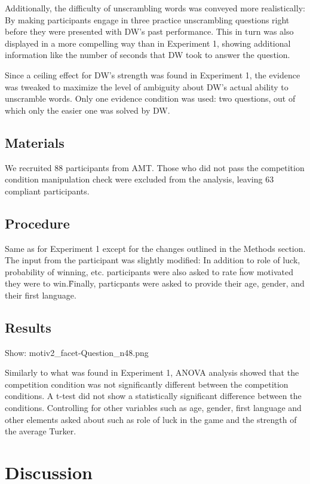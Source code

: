\documentclass{article}
\begin{document}
Additionally, the difficulty of unscrambling words was conveyed more realistically: By making participants engage in three practice unscrambling questions right before they were presented with DW's past performance. This in turn was also displayed in a more compelling way than in Experiment 1, showing additional information like the number of seconds that DW took to answer the question.

Since a ceiling effect for DW's strength was found in Experiment 1, the evidence was tweaked to maximize the level of ambiguity about DW's actual ability to unscramble words. Only one evidence condition was used: two questions, out of which only the easier one was solved by DW.

\subsection{Materials}

We recruited 88 participants from AMT. Those who did not pass the competition condition manipulation check were excluded from the analysis, leaving 63 compliant participants.

\subsection{Procedure}

Same as for Experiment 1 except for the changes outlined in the Methods section. The input from the participant was slightly modified: In addition to role of luck, probability of winning, etc. participants were also asked to rate \"how motivated they were to win.\" Finally, particpants were asked to provide their age, gender, and their first language. 

\subsection{Results}

Show: motiv2_facet-Question_n48.png

Similarly to what was found in Experiment 1, ANOVA analysis showed that the competition condition was not significantly different between the competition conditions. A t-test did not show a statistically significant difference between the conditions. Controlling for other variables such as age, gender, first language and other elements asked about such as role of luck in the game and the strength of the average Turker.


\section{Discussion}
\end{document}
